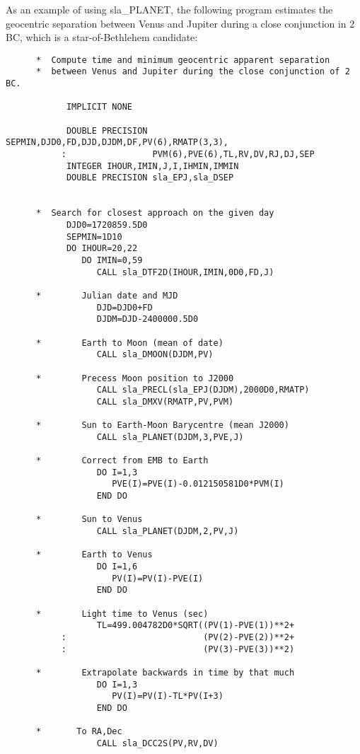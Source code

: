 \documentclass[11pt,twoside]{article}
\begin{document}
As an example of using
sla\_PLANET,
the following program estimates the geocentric separation
between Venus and Jupiter during a close conjunction
in 2\,BC, which is a star-of-Bethlehem candidate:
\goodbreak
\begin{verbatim}
      *  Compute time and minimum geocentric apparent separation
      *  between Venus and Jupiter during the close conjunction of 2 BC.

            IMPLICIT NONE

            DOUBLE PRECISION SEPMIN,DJD0,FD,DJD,DJDM,DF,PV(6),RMATP(3,3),
           :                 PVM(6),PVE(6),TL,RV,DV,RJ,DJ,SEP
            INTEGER IHOUR,IMIN,J,I,IHMIN,IMMIN
            DOUBLE PRECISION sla_EPJ,sla_DSEP


      *  Search for closest approach on the given day
            DJD0=1720859.5D0
            SEPMIN=1D10
            DO IHOUR=20,22
               DO IMIN=0,59
                  CALL sla_DTF2D(IHOUR,IMIN,0D0,FD,J)

      *        Julian date and MJD
                  DJD=DJD0+FD
                  DJDM=DJD-2400000.5D0

      *        Earth to Moon (mean of date)
                  CALL sla_DMOON(DJDM,PV)

      *        Precess Moon position to J2000
                  CALL sla_PRECL(sla_EPJ(DJDM),2000D0,RMATP)
                  CALL sla_DMXV(RMATP,PV,PVM)

      *        Sun to Earth-Moon Barycentre (mean J2000)
                  CALL sla_PLANET(DJDM,3,PVE,J)

      *        Correct from EMB to Earth
                  DO I=1,3
                     PVE(I)=PVE(I)-0.012150581D0*PVM(I)
                  END DO

      *        Sun to Venus
                  CALL sla_PLANET(DJDM,2,PV,J)

      *        Earth to Venus
                  DO I=1,6
                     PV(I)=PV(I)-PVE(I)
                  END DO

      *        Light time to Venus (sec)
                  TL=499.004782D0*SQRT((PV(1)-PVE(1))**2+
           :                           (PV(2)-PVE(2))**2+
           :                           (PV(3)-PVE(3))**2)

      *        Extrapolate backwards in time by that much
                  DO I=1,3
                     PV(I)=PV(I)-TL*PV(I+3)
                  END DO

      *       To RA,Dec
                  CALL sla_DCC2S(PV,RV,DV)


\end{verbatim}
\end{document}
